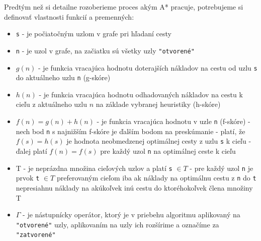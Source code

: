 \begin{definition}\label{def:astar}
    Predtým než si detailne rozoberieme proces akým A* pracuje, potrebujeme si definovať vlastnosti funkcií a premenných:
    \begin{itemize}
        \item \verb|s| - je počiatočným uzlom v grafe pri hľadaní cesty
        \item \verb|n| - je uzol v grafe, na začiatku sú všetky uzly \verb|"otvorené"|
        \item $g(n)$ - \textnormal{je funkcia vracajúca hodnotu doterajších nákladov na cestu od uzlu} \verb|s| do aktuálneho uzlu \verb|n| (g-skóre)
        \item $h(n)$ - je funkcia vracajúca hodnotu odhadovaných nákladov na cestu k cieľu z aktuálneho uzlu $n$ na základe vybranej heuristiky (h-skóre)
        \item $f(n) = g(n) + h(n)$ - je funkcia vracajúca hodnotu v uzle \verb|n| (f-skóre) \newline
        \hspace*{0.67cm} - nech bod \verb|n| s najnižším f-skóre je ďalším bodom na preskúmanie \newline
        \hspace*{0.67cm} - platí, že $f(s) = h(s)$ je hodnota neobmedzenej optimálnej cesty z uzlu \verb|s| k cieľu \newline
        \hspace*{0.67cm} - ďalej platí $f(n) = f(s)$ pre každý uzol \verb|n| na optimálnej ceste k cieľu
        \item T - je neprázdna množina cieľových uzlov a platí \verb|s| $\in T$ \newline
        \hspace*{0.67cm} - pre každý uzol \verb|n| je prvok \verb|t| $\in T$ preferovaným cieľom iba ak náklady na optimálnu cestu z \verb|n| do \verb|t| nepresiahnu náklady na akúkoľvek inú cestu do ktoréhokoľvek člena množiny T
        \item $\Gamma$ - je nástupnícky operátor, ktorý je v priebehu algoritmu aplikovaný na \verb|"otvorené"| uzly, aplikovaním na uzly ich rozšírime a označíme za \verb|"zatvorené"|
    \end{itemize}
\end{definition}

